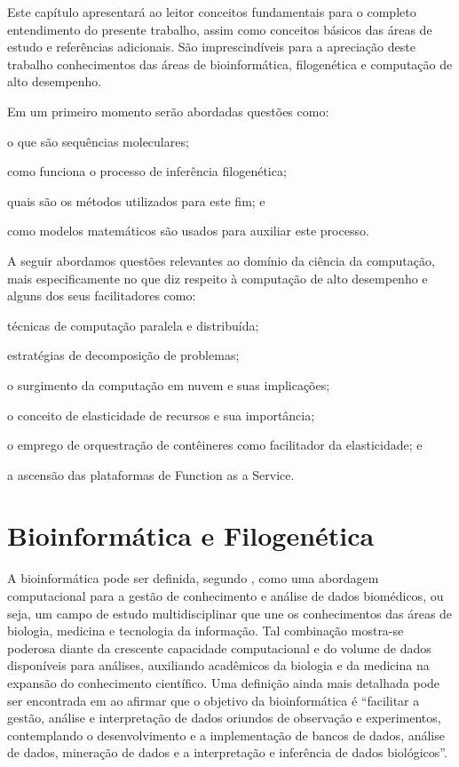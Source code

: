 \documentclass[english,brazilian]{UNISINOSmonografia} %
\begin{document}


Este capítulo apresentará ao leitor conceitos fundamentais para o completo entendimento do presente trabalho, assim como conceitos básicos das áreas de estudo e referências adicionais.
São imprescindíveis para a apreciação deste trabalho conhecimentos das áreas de bioinformática, filogenética e computação de alto desempenho.



Em um primeiro momento serão abordadas questões como:
\begin{inparaenum} 
	\item o que são sequências moleculares;
	\item como funciona o processo de inferência filogenética;
	\item quais são os métodos utilizados para este fim; e
	\item como modelos matemáticos são usados para auxiliar este processo.
\end{inparaenum}
A seguir abordamos questões relevantes ao domínio da ciência da computação, mais especificamente no que diz respeito à computação de alto desempenho e alguns dos seus facilitadores como:
\begin{inparaenum} 
	\item técnicas de computação paralela e distribuída;
	\item estratégias de decomposição de problemas;
	\item o surgimento da computação em nuvem e suas implicações;
	\item o conceito de elasticidade de recursos e sua importância;
	\item o emprego de orquestração de contêineres como facilitador da elasticidade; e
	\item a ascensão das plataformas de Function as a Service.
\end{inparaenum}


\section{Bioinformática e Filogenética}
\label{sec:bioinformatica}


A bioinformática pode ser definida, segundo , como uma abordagem computacional para a gestão de conhecimento e análise de dados biomédicos, ou seja, um campo de estudo multidisciplinar que une os conhecimentos das áreas de biologia, medicina e tecnologia da informação.
Tal combinação mostra-se poderosa diante da crescente capacidade computacional e do volume de dados disponíveis para análises, auxiliando acadêmicos da biologia e da medicina na expansão do conhecimento científico.
Uma definição ainda mais detalhada pode ser encontrada em  ao afirmar que o objetivo da bioinformática é ``facilitar a gestão, análise e interpretação de dados oriundos de observação e experimentos, contemplando o desenvolvimento e a implementação de bancos de dados, análise de dados, mineração de dados e a interpretação e inferência de dados biológicos''.
\end{document}
